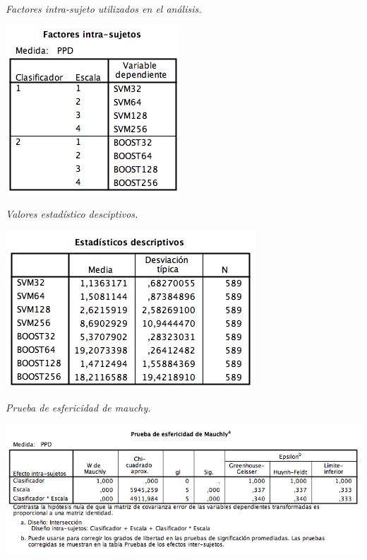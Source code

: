 \begin{table}[htc]
  \centering
  \caption{\em  Factores intra-sujeto utilizados en el análisis.}  
  \label{fig:intrasuj}
  \includegraphics[scale=1]{images/intrasujeto}
\end{table}

\begin{table}[htc]
  \centering
  \caption{\em Valores estadístico desciptivos.}  
  \label{fig:descriptivos}
  \includegraphics[scale=1]{images/estad}
\end{table}

\begin{table}[htc]
  \centering
  \caption{\em Prueba de esfericidad de mauchy.}  
  \label{fig:mauchy}
  \includegraphics[scale=.5]{images/mauchy}
\end{table}


